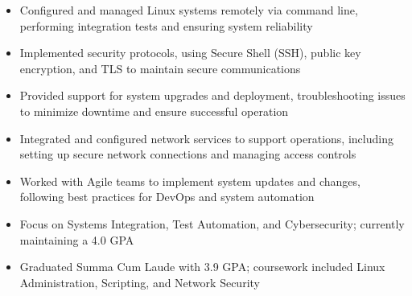 \par\smallskip
\noindent
\begin{minipage}{20cm}
  \begin{minipage}{9.75cm}
    \begin{itemize}
      \item Configured and managed Linux systems remotely via command line, performing integration tests and ensuring system reliability
      \item Implemented security protocols, using Secure Shell (SSH), public key encryption, and TLS to maintain secure communications
      \item Provided support for system upgrades and deployment, troubleshooting issues to minimize downtime and ensure successful operation
    \end{itemize}
  \end{minipage}
  \hfill
  \begin{minipage}{9.75cm}
    \begin{itemize}
      \item Integrated and configured network services to support operations, including setting up secure network connections and managing access controls
      \item Worked with Agile teams to implement system updates and changes, following best practices for DevOps and system automation
    \end{itemize}
  \end{minipage}
\end{minipage}

\begin{itemize}
  \item Focus on Systems Integration, Test Automation, and Cybersecurity; currently maintaining a 4.0 GPA
\end{itemize}
\divider

\begin{itemize}
  \item Graduated Summa Cum Laude with 3.9 GPA; coursework included Linux Administration, Scripting, and Network Security
\end{itemize}

\noindent
\begin{minipage}{20cm}
     
      
      
\end{minipage}


